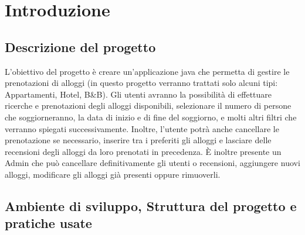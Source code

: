 \documentclass[10pt]{article}
\begin{document}
\tableofcontents

\newpage

\section{Introduzione}

\subsection{Descrizione del progetto}

L'obiettivo del progetto è creare un'applicazione java che permetta di gestire le prenotazioni di alloggi (in questo progetto verranno trattati solo alcuni tipi: Appartamenti, Hotel, B\&B). Gli utenti avranno la possibilità di effettuare ricerche e prenotazioni degli alloggi disponibili, selezionare il numero di persone che soggiorneranno, la data di inizio e di fine del soggiorno, e molti altri filtri che verranno spiegati successivamente. Inoltre, l'utente potrà anche cancellare le prenotazione se necessario, inserire tra i preferiti gli alloggi e lasciare delle recensioni degli alloggi da loro prenotati in precedenza. \`E inoltre presente un Admin che può cancellare definitivamente gli utenti o recensioni, aggiungere nuovi alloggi, modificare gli alloggi già presenti oppure rimuoverli.

\subsection{Ambiente di sviluppo, Struttura del progetto e pratiche usate}
\end{document}
